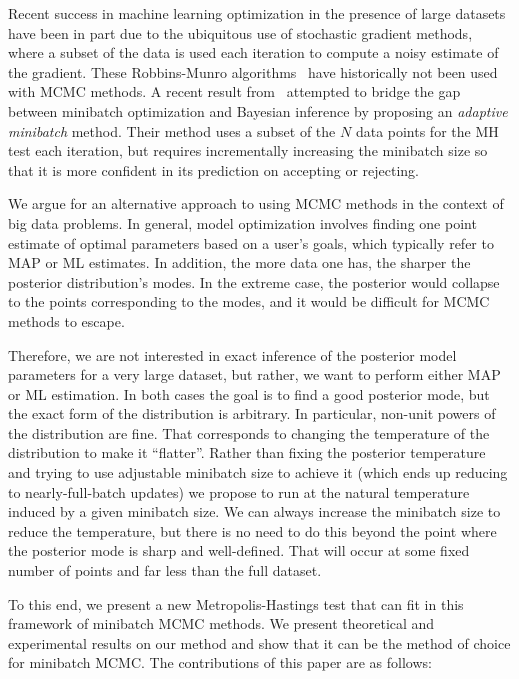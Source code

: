 \documentclass{article}
\begin{document}
Recent success in machine learning optimization in the presence of large datasets have been in part
due to the ubiquitous use of stochastic gradient methods, where a subset of the data is used each
iteration to compute a noisy estimate of the gradient. These Robbins-Munro
algorithms~\cite{RobbinsMonro1951} have historically not been used with MCMC methods. A recent
result from~\cite{cutting_mh_2014} attempted to bridge the gap between minibatch optimization and
Bayesian inference by proposing an \emph{adaptive minibatch} method. Their method uses a subset of
the $N$ data points for the MH test each iteration, but requires incrementally increasing the
minibatch size so that it is more confident in its prediction on accepting or rejecting.

We argue for an alternative approach to using MCMC methods in the context of big data problems. In
general, model optimization involves finding one point estimate of optimal parameters based on a
user's goals, which typically refer to MAP or ML estimates. In addition, the more data one has, the
sharper the posterior distribution's modes. In the extreme case, the posterior would collapse to the
points corresponding to the modes, and it would be difficult for MCMC methods to escape.

Therefore, we are not interested in exact inference of the posterior model parameters for a very
large dataset, but rather, we want to perform either MAP or ML estimation. In both cases the goal is
to find a good posterior mode, but the exact form of the distribution is arbitrary. In particular,
non-unit powers of the distribution are fine. That corresponds to changing the temperature of the
distribution to make it ``flatter''.  Rather than fixing the posterior temperature and trying to use
adjustable minibatch size to achieve it (which ends up reducing to nearly-full-batch updates) we
propose to run at the natural temperature induced by a given minibatch size. We can always increase
the minibatch size to reduce the temperature, but there is no need to do this beyond the point where
the posterior mode is sharp and well-defined. That will occur at some fixed number of points and far
less than the full dataset.

To this end, we present a new Metropolis-Hastings test that can fit in this framework of minibatch
MCMC methods. We present theoretical and experimental results on our method and show that it can be
the method of choice for minibatch MCMC. The contributions of this paper are as follows:
\end{document}
